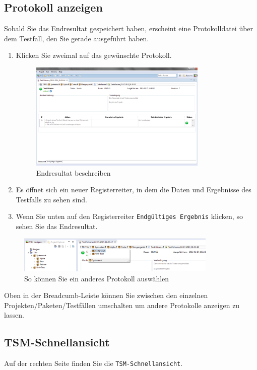 \documentclass[11pt,a4paper,titlepage]{article}
\begin{document}
\subsection{Protokoll anzeigen}
Sobald Sie das Endresultat gespeichert haben, erscheint eine Protokolldatei über dem Testfall, den Sie gerade ausgeführt haben.
\begin{enumerate}
\item Klicken Sie zweimal auf das gewünschte Protokoll.

\begin{figure}[H]
\centering
\includegraphics[width= 320px]{BilderHandbuch/Protokoll/Protokoll.png}
\caption{Endresultat beschreiben}
\label{fig:Protokoll}
\end{figure}

\item Es öffnet sich ein neuer Registerreiter, in dem die Daten und Ergebnisse des Testfalls zu sehen sind.
\item Wenn Sie unten auf den Registerreiter \texttt{Endgültiges Ergebnis} klicken, so sehen Sie das Endresultat.
\end{enumerate}


\begin{figure}[H]
\centering
\includegraphics[width= 360px]{BilderHandbuch/Protokoll/Breadcrumb.png}
\caption{So können Sie ein anderes Protokoll auswählen}
\label{fig:Breadcrumb}
\end{figure}

Oben in der Breadcumb-Leiste können Sie zwischen den einzelnen Projekten/Paketen/Testfällen umschalten um andere Protokolle anzeigen zu lassen.

\subsection{TSM-Schnellansicht}
Auf der rechten Seite finden Sie die \texttt{TSM-Schnellansicht}.
\end{document}
